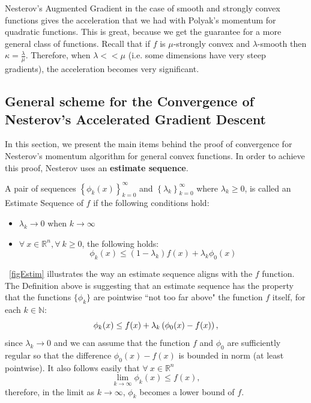 \documentclass{article}
\begin{document}
Nesterov's Augmented Gradient in the case of smooth and strongly convex functions gives the acceleration that we had with Polyak's momentum for quadratic functions. This is great, because we get the guarantee for a more general class of functions. Recall that if $f$ is $\mu$-strongly convex and $\lambda$-smooth then $\kappa = \frac{\lambda}{\mu}$. Therefore, when $\lambda << \mu$ (i.e. some dimensions have very steep gradients), the acceleration becomes very significant.
\newline

\subsection{General scheme for the Convergence of Nesterov's Accelerated Gradient Descent}
In this section, we present the main items behind the proof of convergence for Nesterov's momentum algorithm for general convex functions. In order to achieve this proof, Nesterov uses an \textbf{estimate sequence}.

\begin{defn}
A pair of sequences $\left\{ \phi_k(x) \right\}_{k=0}^\infty$ and $\left\{ \lambda_k \right\}_{k=0}^\infty$ where $\lambda_k \geq 0$, is called an Estimate Sequence of $f$ if the following conditions hold:
\begin{itemize}
\item $\lambda_k \mathop{\to} 0$ when $k \to \infty$
\item $\forall \ x \in \mathbb{R}^n, \forall \ k \geq 0$, the following holds: 
\[
\phi_k(x) \leq (1- \lambda_k) f(x) + \lambda_k \phi_0 (x)
\]
\end{itemize}
\label{defEstim}
\end{defn}

\figurename \ \ref{figEstim} illustrates the way an estimate sequence aligns with the $f$ function. The Definition above is suggesting that an estimate sequence has the property that the functions $\{\phi_k\}$ are pointwise ``not too far above" the function $f$ itself, for each $k\in \mathbb{N}$: 
$$ \phi_k(x) \leq f(x) + \lambda_k\left( \phi_0 (x)-f(x) \right), $$
since $\lambda_k \to 0$ and we can assume that the function $f$ and $\phi_0$ are sufficiently regular so that the difference $ \phi_0 (x)-f(x)$ is bounded in norm (at least pointwise). It also follows easily that $\forall \ x \in \mathbb{R}^n$
\begin{equation} \lim_{k\to\infty}{\phi_k(x)} \leq f(x),
\end{equation}
therefore, in the limit as $k \to \infty$, $\phi_k$ becomes a lower bound of $f$. \\
\end{document}
